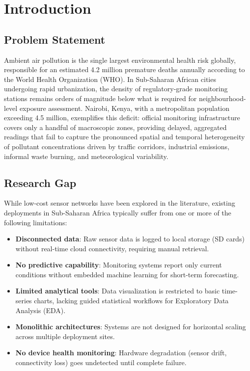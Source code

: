 \documentclass[12pt,a4paper]{article}
\begin{document}
\newpage
\tableofcontents
\listoffigures
\listoftables
\newpage

\section{Introduction}

\subsection{Problem Statement}
Ambient air pollution is the single largest environmental health risk globally, responsible for an estimated 4.2 million premature deaths annually according to the World Health Organization (WHO). In Sub-Saharan African cities undergoing rapid urbanization, the density of regulatory-grade monitoring stations remains orders of magnitude below what is required for neighbourhood-level exposure assessment. Nairobi, Kenya, with a metropolitan population exceeding 4.5 million, exemplifies this deficit: official monitoring infrastructure covers only a handful of macroscopic zones, providing delayed, aggregated readings that fail to capture the pronounced spatial and temporal heterogeneity of pollutant concentrations driven by traffic corridors, industrial emissions, informal waste burning, and meteorological variability.

\subsection{Research Gap}
While low-cost sensor networks have been explored in the literature, existing deployments in Sub-Saharan Africa typically suffer from one or more of the following limitations:
\begin{itemize}[nosep]
    \item \textbf{Disconnected data}: Raw sensor data is logged to local storage (SD cards) without real-time cloud connectivity, requiring manual retrieval.
    \item \textbf{No predictive capability}: Monitoring systems report only current conditions without embedded machine learning for short-term forecasting.
    \item \textbf{Limited analytical tools}: Data visualization is restricted to basic time-series charts, lacking guided statistical workflows for Exploratory Data Analysis (EDA).
    \item \textbf{Monolithic architectures}: Systems are not designed for horizontal scaling across multiple deployment sites.
    \item \textbf{No device health monitoring}: Hardware degradation (sensor drift, connectivity loss) goes undetected until complete failure.
\end{itemize}
\end{document}
